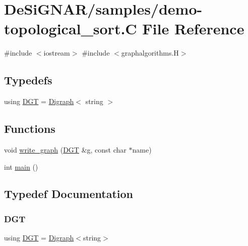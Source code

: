 \hypertarget{demo-topological__sort_8_c}{}\section{De\+Si\+G\+N\+A\+R/samples/demo-\/topological\+\_\+sort.C File Reference}
\label{demo-topological__sort_8_c}
{\ttfamily \#include $<$iostream$>$}\newline
{\ttfamily \#include $<$graphalgorithms.\+H$>$}\newline
\subsection*{Typedefs}
\begin{DoxyCompactItemize}
\item 
using \hyperlink{demo-topological__sort_8_c_a8f123599e859454680bf37e203c0b18b}{D\+GT} = \hyperlink{class_designar_1_1_digraph}{Digraph}$<$ string $>$
\end{DoxyCompactItemize}
\subsection*{Functions}
\begin{DoxyCompactItemize}
\item 
void \hyperlink{demo-topological__sort_8_c_ab82a33da73b0e5278780967809b0791d}{write\+\_\+graph} (\hyperlink{demo-buildgraph_8_c_ae73e956c2a8cf0a58255aa6b659985e0}{D\+GT} \&g, const char $\ast$name)
\item 
int \hyperlink{demo-topological__sort_8_c_ae66f6b31b5ad750f1fe042a706a4e3d4}{main} ()
\end{DoxyCompactItemize}


\subsection{Typedef Documentation}
\mbox{\label{demo-topological__sort_8_c_a8f123599e859454680bf37e203c0b18b}} 
\subsubsection{\texorpdfstring{D\+GT}{DGT}}
{\footnotesize\ttfamily using \hyperlink{demo-buildgraph_8_c_ae73e956c2a8cf0a58255aa6b659985e0}{D\+GT} =  \hyperlink{class_designar_1_1_digraph}{Digraph}$<$string$>$}



